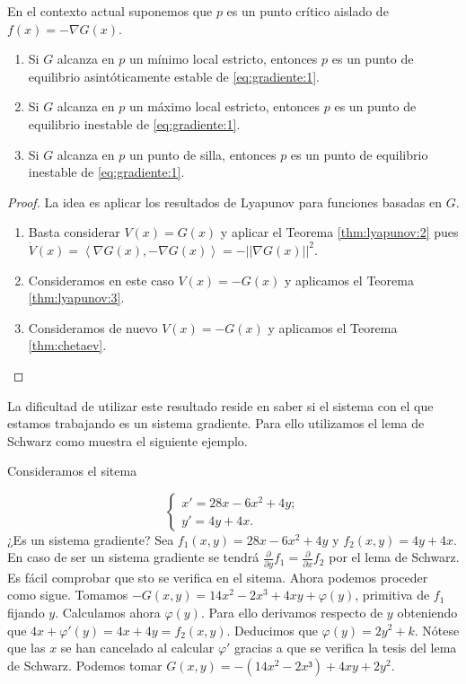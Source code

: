 \begin{proposition} \label{prop:gradiente:1} En el contexto actual suponemos que $p$ es un punto
  crítico aislado de $f(x) = - \nabla G(x)$.
  \begin{enumerate}
  \item Si $G$ alcanza en $p$ un mínimo local estricto, entonces $p$ es un punto de equilibrio
    asintóticamente estable de \eqref{eq:gradiente:1}.
  \item Si $G$ alcanza en $p$ un máximo local estricto, entonces $p$ es un punto de equilibrio
    inestable de \eqref{eq:gradiente:1}.
  \item Si $G$ alcanza en $p$ un punto de silla, entonces $p$ es un punto de equilibrio inestable de
    \eqref{eq:gradiente:1}.
  \end{enumerate}
\end{proposition}
\begin{proof}
  La idea es aplicar los resultados de Lyapunov para funciones basadas en $G$.
  
  \begin{enumerate}
  \item Basta considerar $V(x) = G(x)$ y aplicar el Teorema \ref{thm:lyapunov:2} pues
    $\dot{V}(x) = \left\langle \nabla G(x), -\nabla G(x) \right\rangle = - ||\nabla G(x)||^2$.
  \item Consideramos en este caso $V(x) = - G(x)$ y aplicamos el Teorema \ref{thm:lyapunov:3}.
  \item Consideramos de nuevo $V(x) = - G(x)$ y aplicamos el Teorema \ref{thm:chetaev}. \qedhere
  \end{enumerate}
\end{proof}

La dificultad de utilizar este resultado reside en saber si el sistema con el que estamos trabajando
es un sistema gradiente. Para ello utilizamos el lema de Schwarz como muestra el siguiente ejemplo.

\begin{ex}
  Consideramos el sitema
  
  \begin{equation}
    \label{eq:schwarz}
    \begin{cases}
      x' = 28x - 6x^2 + 4y; \\
      y' = 4y +4x.
    \end{cases}
  \end{equation}
  ¿Es un sistema gradiente? Sea $f_1(x,y) = 28x - 6x^2 + 4y$ y $f_2(x,y) = 4y +4x$. En caso de ser
  un sistema gradiente se tendrá $\frac{\partial}{\partial y} f_1 = \frac{\partial}{\partial x} f_2$
  por el lema de Schwarz. Es fácil comprobar que sto se verifica en el sitema. Ahora podemos
  proceder como sigue. Tomamos $-G(x,y) = 14x^2 - 2x^3 + 4xy + \varphi(y)$, primitiva de $f_1$
  fijando $y$. Calculamos ahora $\varphi(y)$. Para ello derivamos respecto de $y$ obteniendo que
  $4x + \varphi'(y) = 4x+4y = f_2(x,y)$. Deducimos que $\varphi(y) = 2y^2 + k$. Nótese que las $x$
  se han cancelado al calcular $\varphi'$ gracias a que se verifica la tesis del lema de
  Schwarz. Podemos tomar $G(x,y) = - (14x^2-2x³)+4xy+2y^2$.
\end{ex}

